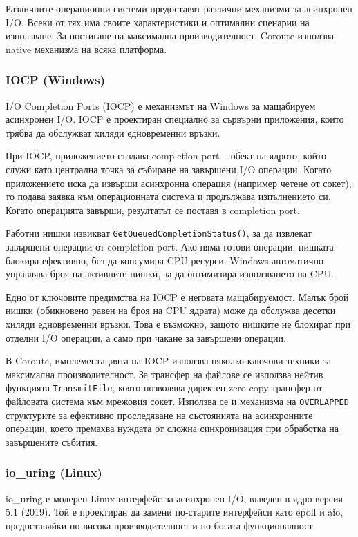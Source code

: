 Различните операционни системи предоставят различни механизми за асинхронен I/O. Всеки от тях има своите характеристики и оптимални сценарии на използване. За постигане на максимална производителност, Coroute използва native механизма на всяка платформа.

\subsubsection{IOCP (Windows)}

I/O Completion Ports (IOCP) \cite{windowsiocp} е механизмът на Windows за мащабируем асинхронен I/O. IOCP е проектиран специално за сървърни приложения, които трябва да обслужват хиляди едновременни връзки.

При IOCP, приложението създава completion port -- обект на ядрото, който служи като централна точка за събиране на завършени I/O операции. Когато приложението иска да извърши асинхронна операция (например четене от сокет), то подава заявка към операционната система и продължава изпълнението си. Когато операцията завърши, резултатът се поставя в completion port.

Работни нишки извикват \texttt{GetQueuedCompletionStatus()}, за да извлекат завършени операции от completion port. Ако няма готови операции, нишката блокира ефективно, без да консумира CPU ресурси. Windows автоматично управлява броя на активните нишки, за да оптимизира използването на CPU.

Едно от ключовите предимства на IOCP е неговата мащабируемост. Малък брой нишки (обикновено равен на броя на CPU ядрата) може да обслужва десетки хиляди едновременни връзки. Това е възможно, защото нишките не блокират при отделни I/O операции, а само при чакане за завършени операции.

В Coroute, имплементацията на IOCP използва няколко ключови техники за максимална производителност. За трансфер на файлове се използва нейтив функцията \texttt{TransmitFile}, която позволява директен zero-copy трансфер от файловата система към мрежовия сокет. Използва се и механизма на \texttt{OVERLAPPED} структурите за ефективно проследяване на състоянията на асинхронните операции, което премахва нуждата от сложна синхронизация при обработка на завършените събития.

\subsubsection{io\_uring (Linux)}

io\_uring \cite{iouring2019} е модерен Linux интерфейс за асинхронен I/O, въведен в ядро версия 5.1 (2019). Той е проектиран да замени по-старите интерфейси като epoll и aio, предоставяйки по-висока производителност и по-богата функционалност.


